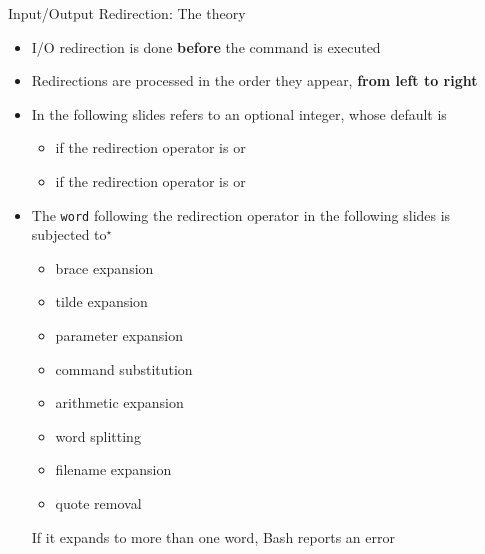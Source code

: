 \begin{frame}{Input/Output Redirection: The theory}
    \begin{itemize}
        \item I/O redirection is done \alert{\textbf{before}} the command is executed
        \item Redirections are processed in the order they appear, \textbf{from left to right}
        \item In the following slides \PB{\texttt{[n]}} refers to an optional integer, whose default is
              \begin{itemize}
                  \item[0] if the redirection operator is \PB{\texttt{<}} or \PB{\texttt{<>}}
                  \item[1] if the redirection operator is \PB{\texttt{>}} or \PB{\texttt{>>}}
              \end{itemize}
        \item The \texttt{word} following the redirection operator in the following slides is subjected to$^\star$
              \begin{itemize}
                  \item brace expansion
                  \item tilde expansion
                  \item parameter expansion
                  \item command substitution
                  \item arithmetic expansion
                  \item word splitting
                  \item filename expansion
                  \item quote removal
              \end{itemize}
              \alert{If it expands to more than one word, Bash reports an error}
    \end{itemize}
\end{frame}
